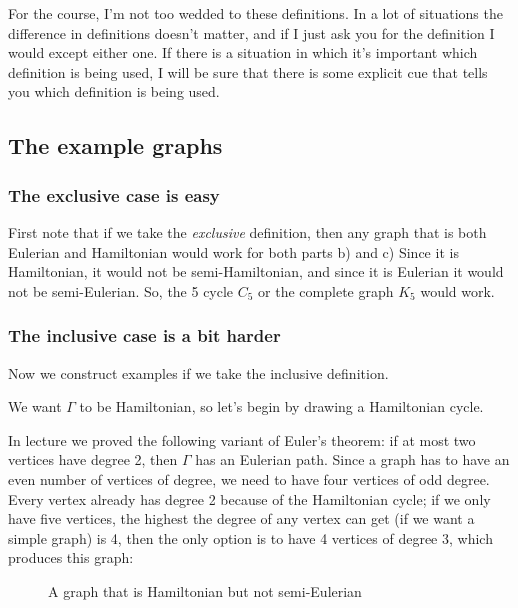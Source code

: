 \documentclass{amsart}
\begin{document}
For the course, I'm not too wedded to these definitions.  In a lot of situations the difference in definitions doesn't matter, and if I just ask you for the definition I would except either one.  If there is a situation in which it's important which definition is being used, I will be sure that there is some explicit cue that tells you which definition is being used.

\subsection*{The example graphs}

\subsubsection*{The exclusive case is easy}
First note that if we take the \emph{exclusive} definition, then any graph that is both Eulerian and Hamiltonian would work for both parts b) and c) Since it is Hamiltonian, it would not be semi-Hamiltonian, and since it is Eulerian it would not be semi-Eulerian.  So, the 5 cycle $C_5$ or the complete graph $K_5$ would work.

\subsubsection*{The inclusive case is a bit harder}
Now we construct examples if we take the inclusive definition.

We want $\Gamma$ to be Hamiltonian, so let's begin by drawing a Hamiltonian cycle.

In lecture we proved the following variant of Euler's theorem: if at most two vertices have degree 2, then $\Gamma$ has an Eulerian path.  Since a graph has to have an even number of vertices of degree, we need to have four vertices of odd degree.  Every vertex already has degree 2 because of the Hamiltonian cycle; if we only have five vertices, the highest the degree of any vertex can get (if we want a simple graph) is 4, then the only option is to have 4 vertices of degree 3, which produces this graph:
\begin{center}
\begin{figure}
  \caption{A graph that is Hamiltonian but not semi-Eulerian}
  \end{figure}
\end{center}
\end{document}
